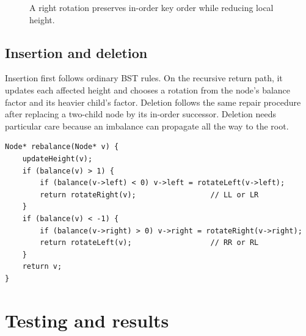 \documentclass[lang=cn,a4paper,newtx,bibend=biber]{elegantpaper}
\begin{document}
\begin{figure}[H]
\centering
{}
\caption{A right rotation preserves in-order key order while reducing local height.}
\label{fig:rotation}
\end{figure}

\subsection{Insertion and deletion}
Insertion first follows ordinary BST rules. On the recursive return path, it updates each affected height and chooses a rotation from the node's balance factor and its heavier child's factor. Deletion follows the same repair procedure after replacing a two-child node by its in-order successor. Deletion needs particular care because an imbalance can propagate all the way to the root.

\begin{lstlisting}[caption={Central rebalancing routine (C++-style pseudocode).},label={lst:rebalance}]
Node* rebalance(Node* v) {
    updateHeight(v);
    if (balance(v) > 1) {
        if (balance(v->left) < 0) v->left = rotateLeft(v->left);
        return rotateRight(v);                 // LL or LR
    }
    if (balance(v) < -1) {
        if (balance(v->right) > 0) v->right = rotateRight(v->right);
        return rotateLeft(v);                  // RR or RL
    }
    return v;
}
\end{lstlisting}

\section{Testing and results}
\end{document}
